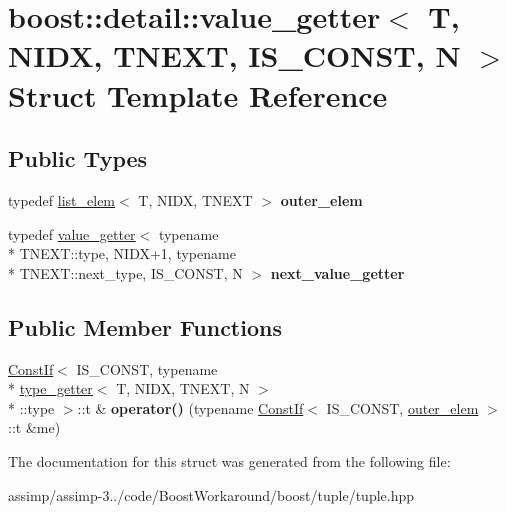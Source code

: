 \hypertarget{structboost_1_1detail_1_1value__getter}{\section{boost\+:\+:detail\+:\+:value\+\_\+getter$<$ T, N\+I\+D\+X, T\+N\+E\+X\+T, I\+S\+\_\+\+C\+O\+N\+S\+T, N $>$ Struct Template Reference}
\label{structboost_1_1detail_1_1value__getter}
}
\subsection*{Public Types}
\begin{DoxyCompactItemize}
\item 
\hypertarget{structboost_1_1detail_1_1value__getter_a6c0c35aff1c0ed2b90b149f1298f9ba4}{typedef \hyperlink{structboost_1_1detail_1_1list__elem}{list\+\_\+elem}$<$ T, N\+I\+D\+X, T\+N\+E\+X\+T $>$ {\bfseries outer\+\_\+elem}}\label{structboost_1_1detail_1_1value__getter_a6c0c35aff1c0ed2b90b149f1298f9ba4}

\item 
\hypertarget{structboost_1_1detail_1_1value__getter_ace54e4fa20374b0d8ba1a4dc3b8fecaa}{typedef \hyperlink{structboost_1_1detail_1_1value__getter}{value\+\_\+getter}$<$ typename \\*
T\+N\+E\+X\+T\+::type, N\+I\+D\+X+1, typename \\*
T\+N\+E\+X\+T\+::next\+\_\+type, I\+S\+\_\+\+C\+O\+N\+S\+T, N $>$ {\bfseries next\+\_\+value\+\_\+getter}}\label{structboost_1_1detail_1_1value__getter_ace54e4fa20374b0d8ba1a4dc3b8fecaa}

\end{DoxyCompactItemize}
\subsection*{Public Member Functions}
\begin{DoxyCompactItemize}
\item 
\hypertarget{structboost_1_1detail_1_1value__getter_a6250b763a3ca35f3d720f2ba24b9afff}{\hyperlink{structboost_1_1detail_1_1_const_if}{Const\+If}$<$ I\+S\+\_\+\+C\+O\+N\+S\+T, typename \\*
\hyperlink{structboost_1_1detail_1_1type__getter}{type\+\_\+getter}$<$ T, N\+I\+D\+X, T\+N\+E\+X\+T, N $>$\\*
\+::type $>$\+::t \& {\bfseries operator()} (typename \hyperlink{structboost_1_1detail_1_1_const_if}{Const\+If}$<$ I\+S\+\_\+\+C\+O\+N\+S\+T, \hyperlink{structboost_1_1detail_1_1list__elem}{outer\+\_\+elem} $>$\+::t \&me)}\label{structboost_1_1detail_1_1value__getter_a6250b763a3ca35f3d720f2ba24b9afff}

\end{DoxyCompactItemize}


The documentation for this struct was generated from the following file\+:\begin{DoxyCompactItemize}
\item 
assimp/assimp-\/3../code/\+Boost\+Workaround/boost/tuple/tuple.\+hpp\end{DoxyCompactItemize}
